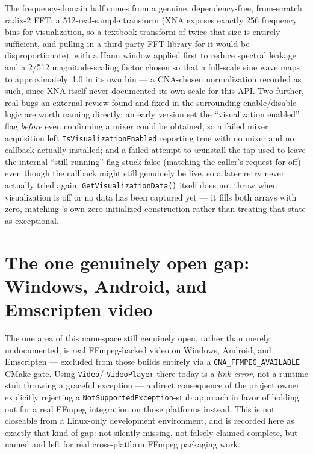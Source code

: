 The frequency-domain half comes from a genuine, dependency-free, from-scratch radix-2 FFT: a
512-real-sample transform (XNA exposes exactly 256 frequency bins for visualization, so a
textbook transform of twice that size is entirely sufficient, and pulling in a third-party FFT
library for it would be disproportionate), with a Hann window applied first to reduce spectral
leakage and a 2/512 magnitude-scaling factor chosen so that a full-scale sine wave maps
to approximately~1.0 in its own bin --- a CNA-chosen normalization recorded as such, since XNA
itself never documented its own scale for this API. Two further, real bugs an external review
found and fixed in the surrounding enable/disable logic are worth naming directly: an early
version set the ``visualization enabled'' flag \emph{before} even confirming a mixer could be
obtained, so a failed mixer acquisition left \texttt{IsVisualizationEnabled} reporting true with
no mixer and no callback actually installed; and a failed attempt to \emph{un}install the tap
used to leave the internal ``still running'' flag stuck false (matching the caller's request for
off) even though the callback might still genuinely be live, so a later retry never actually
tried again. \texttt{GetVisualizationData()} itself does not throw when visualization is off or
no data has been captured yet --- it fills both arrays with zero, matching
's own zero-initialized construction rather than treating that state
as exceptional.

\section{The one genuinely open gap: Windows, Android, and Emscripten video}

The one area of this namespace still genuinely open, rather than merely undocumented, is
real FFmpeg-backed video on Windows, Android, and Emscripten --- excluded from those builds
entirely via a \texttt{CNA\_FFMPEG\_AVAILABLE} CMake gate. Using \texttt{Video}/%
\texttt{VideoPlayer} there today is a \emph{link error}, not a runtime stub throwing a
graceful exception --- a direct consequence of the project owner explicitly rejecting a
\texttt{NotSupportedException}-stub approach in favor of holding out for a real FFmpeg
integration on those platforms instead. This is not closeable from a Linux-only development
environment, and is recorded here as exactly that kind of gap: not silently missing, not
falsely claimed complete, but named and left for real cross-platform FFmpeg packaging work.


